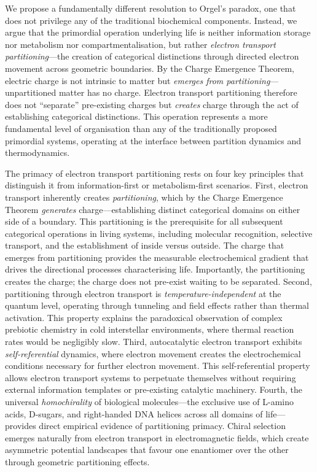 \documentclass[12pt,a4paper]{article}
\begin{document}
We propose a fundamentally different resolution to Orgel's paradox, one that does not privilege any of the traditional biochemical components. Instead, we argue that the primordial operation underlying life is neither information storage nor metabolism nor compartmentalisation, but rather \emph{electron transport partitioning}---the creation of categorical distinctions through directed electron movement across geometric boundaries. By the Charge Emergence Theorem, electric charge is not intrinsic to matter but \emph{emerges from partitioning}---unpartitioned matter has no charge. Electron transport partitioning therefore does not ``separate'' pre-existing charges but \emph{creates} charge through the act of establishing categorical distinctions. This operation represents a more fundamental level of organisation than any of the traditionally proposed primordial systems, operating at the interface between partition dynamics and thermodynamics.

The primacy of electron transport partitioning rests on four key principles that distinguish it from information-first or metabolism-first scenarios. First, electron transport inherently creates \emph{partitioning}, which by the Charge Emergence Theorem \emph{generates} charge---establishing distinct categorical domains on either side of a boundary. This partitioning is the prerequisite for all subsequent categorical operations in living systems, including molecular recognition, selective transport, and the establishment of inside versus outside. The charge that emerges from partitioning provides the measurable electrochemical gradient that drives the directional processes characterising life. Importantly, the partitioning creates the charge; the charge does not pre-exist waiting to be separated. Second, partitioning through electron transport is \emph{temperature-independent} at the quantum level, operating through tunneling and field effects rather than thermal activation. This property explains the paradoxical observation of complex prebiotic chemistry in cold interstellar environments, where thermal reaction rates would be negligibly slow. Third, autocatalytic electron transport exhibits \emph{self-referential} dynamics, where electron movement creates the electrochemical conditions necessary for further electron movement. This self-referential property allows electron transport systems to perpetuate themselves without requiring external information templates or pre-existing catalytic machinery. Fourth, the universal \emph{homochirality} of biological molecules—the exclusive use of L-amino acids, D-sugars, and right-handed DNA helices across all domains of life—provides direct empirical evidence of partitioning primacy. Chiral selection emerges naturally from electron transport in electromagnetic fields, which create asymmetric potential landscapes that favour one enantiomer over the other through geometric partitioning effects.
\end{document}
